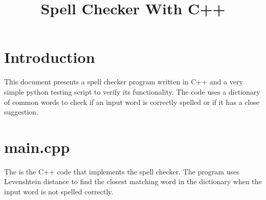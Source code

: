 \documentclass{article}
\title{Spell Checker With C++}
\author{}
\date{}
\begin{document}
\maketitle

\section*{Introduction}
This document presents a spell checker program written in C++ and a very simple python testing script to verify its functionality. The code uses a dictionary of common words to check if an input word is correctly spelled or if it has a close suggestion. 

\section*{main.cpp}
The is the C++ code that implements the spell checker. The program uses Levenshtein distance to find the closest matching word in the dictionary when the input word is not spelled correctly.
\end{document}
